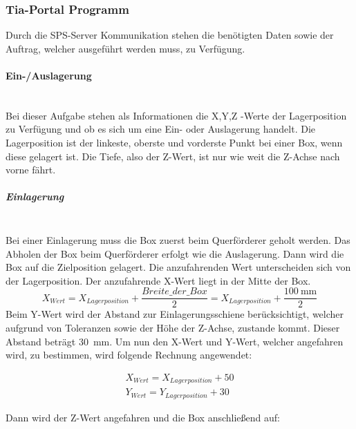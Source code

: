 \subsubsection{Tia-Portal Programm}
Durch die SPS-Server Kommunikation stehen die benötigten Daten sowie der Auftrag, welcher ausgeführt werden muss, zu Verfügung. 

    \paragraph{Ein-/Auslagerung} \mbox{} \\
    Bei dieser Aufgabe stehen als Informationen die X,Y,Z -Werte der Lagerposition zu Verfügung und ob es sich um eine Ein- oder Auslagerung handelt. Die Lagerposition ist der linkeste, oberste und vorderste Punkt bei einer Box, wenn diese gelagert ist. Die Tiefe, also der Z-Wert, ist nur wie weit die Z-Achse nach vorne fährt. 
    
    \subparagraph{Einlagerung} \mbox{} \\
    Bei einer Einlagerung muss die Box zuerst beim Querförderer geholt werden. Das Abholen der Box beim Querförderer erfolgt wie die Auslagerung. Dann wird die Box auf die Zielposition gelagert. Die anzufahrenden Wert unterscheiden sich von der Lagerposition. Der anzufahrende X-Wert liegt in der Mitte der Box. 
    \begin{equation*}
        X_{Wert} = X_{Lagerposition} + \frac{Breite\_der\_Box}{2} = X_{Lagerposition} + \frac{\qty{100}{\milli\meter}}{2}
    \end{equation*}
    Beim Y-Wert wird der Abstand zur Einlagerungsschiene berücksichtigt, welcher aufgrund von Toleranzen sowie der Höhe der Z-Achse, zustande kommt. Dieser Abstand beträgt \qty{30}{\milli\meter}.
    Um nun den X-Wert und Y-Wert, welcher angefahren wird, zu bestimmen, wird folgende Rechnung angewendet:

    \vspace{-6mm}

    \begin{equation*}
        \begin{split}
                X_{Wert} = X_{Lagerposition} + 50
                \\
                Y_{Wert} = Y_{Lagerposition} + 30  
        \end{split} 
    \end{equation*}

    Dann wird der Z-Wert angefahren und die Box anschließend auf:

